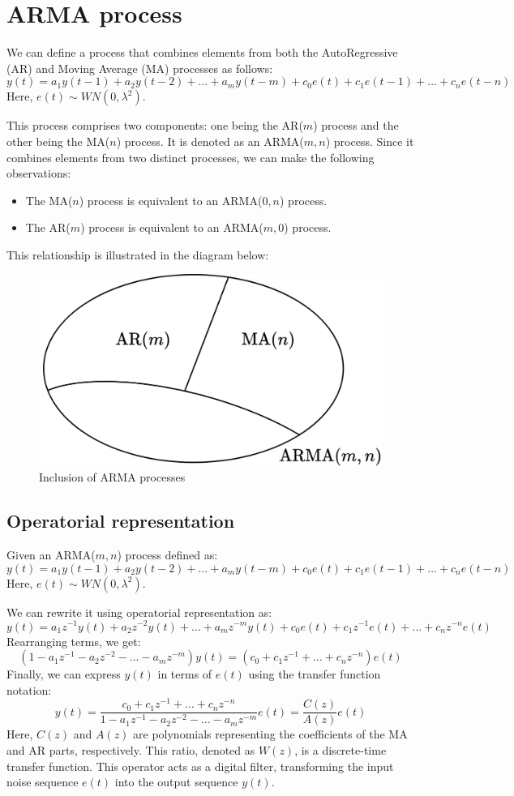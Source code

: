 \section{ARMA process}

We can define a process that combines elements from both the AutoRegressive (AR) and Moving Average (MA) processes as follows:
\[y(t)=a_1y(t-1)+a_2y(t-2)+\dots+a_my(t-m)+c_0e(t)+c_1e(t-1)+\dots+c_ne(t-n) \]
Here, $e(t)\sim WN(0,\lambda^2)$.

This process comprises two components: one being the AR($m$) process and the other being the MA($n$) process. 
It is denoted as an ARMA($m,n$) process.
Since it combines elements from two distinct processes, we can make the following observations:
\begin{itemize}
    \item The MA($n$) process is equivalent to an ARMA($0,n$) process.
    \item The AR($m$) process is equivalent to an ARMA($m,0$) process. 
\end{itemize}
This relationship is illustrated in the diagram below:
\begin{figure}[H]
    \centering
    \includegraphics[width=0.45\linewidth]{images/set.png}
    \caption{Inclusion of ARMA processes}
\end{figure}

\subsection{Operatorial representation}
Given an ARMA($m,n$) process defined as:
\[y(t)=a_1y(t-1)+a_2y(t-2)+\dots+a_my(t-m)+c_0e(t)+c_1e(t-1)+\dots+c_ne(t-n)\]
Here, $e(t)\sim WN(0,\lambda^2)$.

We can rewrite it using operatorial representation as:
\[y(t)=a_1z^{-1}y(t)+a_2z^{-2}y(t)+\dots+a_mz^{-m}y(t)+c_0e(t)+c_1z^{-1}e(t)+\dots+c_nz^{-n}e(t)\]
Rearranging terms, we get:
\[\left(1- a_1z^{-1}-a_2z^{-2}-\dots-a_mz^{-m}\right)y(t)=\left(c_0+c_1z^{-1}+\dots+c_nz^{-n}\right)e(t)\]
Finally, we can express $y(t)$ in terms of $e(t)$ using the transfer function notation:
\[y(t)=\dfrac{c_0+c_1z^{-1}+\dots+c_nz^{-n}}{1- a_1z^{-1}-a_2z^{-2}-\dots-a_mz^{-m}}e(t)=\dfrac{C(z)}{A(z)}e(t)\]
Here, $C(z)$ and $A(z)$ are polynomials representing the coefficients of the MA and AR parts, respectively. 
This ratio, denoted as $W(z)$, is a discrete-time transfer function. 
This operator acts as a digital filter, transforming the input noise sequence $e(t)$ into the output sequence $y(t)$.

